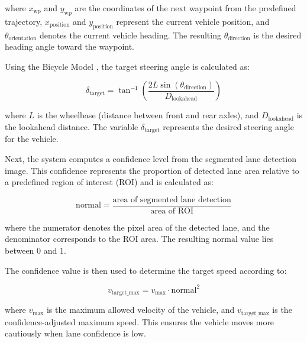 \documentclass[conference, a4paper]{IEEEtran}[2015/08/26]
\begin{document}
where $x_{\text{wp}}$ and $y_{\text{wp}}$ are the coordinates of the next waypoint from the predefined trajectory, $x_{\text{position}}$ and $y_{\text{position}}$ represent the current vehicle position, and $\theta_{\text{orientation}}$ denotes the current vehicle heading. The resulting $\theta_{\text{direction}}$ is the desired heading angle toward the waypoint.

\par
Using the Bicycle Model \cite{rajamani2011vehicle}, the target steering angle is calculated as:

\begin{equation}
	\delta_{\text{target}} = \tan^{-1}\!\left( \frac{2L \sin(\theta_{\text{direction}})}{D_{\text{lookahead}}} \right)
	\label{eq:bicycle_model_full}
\end{equation}

where $L$ is the wheelbase (distance between front and rear axles), and $D_{\text{lookahead}}$ is the lookahead distance. The variable $\delta_{\text{target}}$ represents the desired steering angle for the vehicle.

\par
Next, the system computes a confidence level from the segmented lane detection image. This confidence represents the proportion of detected lane area relative to a predefined region of interest (ROI) and is calculated as:

\begin{equation}
	\text{normal} = \frac{\text{area of segmented lane detection}}{\text{area of ROI}}
	\label{eq:confidence_level}
\end{equation}

where the numerator denotes the pixel area of the detected lane, and the denominator corresponds to the ROI area. The resulting $\text{normal}$ value lies between 0 and 1.

\par
The confidence value is then used to determine the target speed according to:

\begin{equation}
	v_{\text{target\_max}} = v_{\text{max}} \cdot \text{normal}^2
	\label{eq:confidence_speed}
\end{equation}

where $v_{\text{max}}$ is the maximum allowed velocity of the vehicle, and $v_{\text{target\_max}}$ is the confidence-adjusted maximum speed. This ensures the vehicle moves more cautiously when lane confidence is low.
\end{document}
